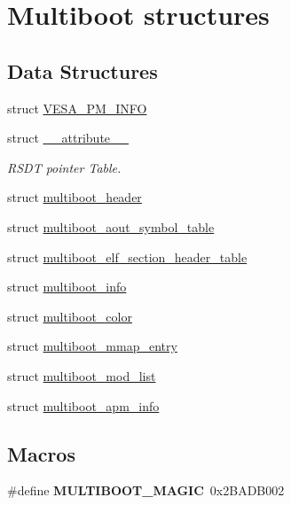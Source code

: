 \hypertarget{group__multiboot__header}{}\section{Multiboot structures}
\label{group__multiboot__header}
\subsection*{Data Structures}
\begin{DoxyCompactItemize}
\item 
struct \hyperlink{structVESA__PM__INFO}{V\+E\+S\+A\+\_\+\+P\+M\+\_\+\+I\+N\+FO}
\item 
struct \hyperlink{struct____attribute____}{\+\_\+\+\_\+attribute\+\_\+\+\_\+}
\begin{DoxyCompactList}\small\item\em R\+S\+DT pointer Table. \end{DoxyCompactList}\item 
struct \hyperlink{structmultiboot__header}{multiboot\+\_\+header}
\item 
struct \hyperlink{structmultiboot__aout__symbol__table}{multiboot\+\_\+aout\+\_\+symbol\+\_\+table}
\item 
struct \hyperlink{structmultiboot__elf__section__header__table}{multiboot\+\_\+elf\+\_\+section\+\_\+header\+\_\+table}
\item 
struct \hyperlink{structmultiboot__info}{multiboot\+\_\+info}
\item 
struct \hyperlink{structmultiboot__color}{multiboot\+\_\+color}
\item 
struct \hyperlink{structmultiboot__mmap__entry}{multiboot\+\_\+mmap\+\_\+entry}
\item 
struct \hyperlink{structmultiboot__mod__list}{multiboot\+\_\+mod\+\_\+list}
\item 
struct \hyperlink{structmultiboot__apm__info}{multiboot\+\_\+apm\+\_\+info}
\end{DoxyCompactItemize}
\subsection*{Macros}
\begin{DoxyCompactItemize}
\item 
\#define {\bfseries M\+U\+L\+T\+I\+B\+O\+O\+T\+\_\+\+M\+A\+G\+IC}~0x2\+B\+A\+D\+B002\hypertarget{group__multiboot__header_ga77973acf8c41a727c90531a8b05d0e3a}{}\label{group__multiboot__header_ga77973acf8c41a727c90531a8b05d0e3a}

\end{DoxyCompactItemize}
